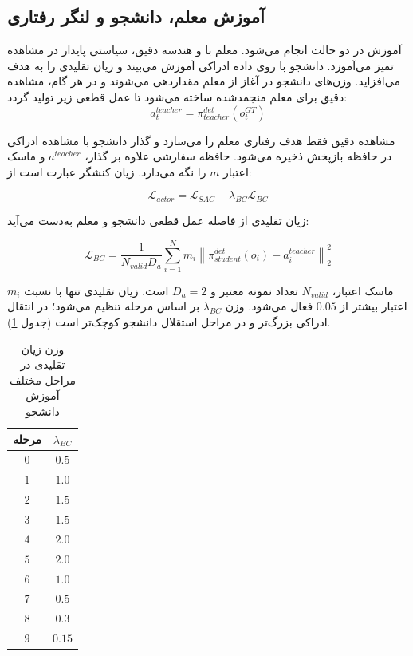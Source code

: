 \subsection{آموزش معلم، دانشجو و لنگر رفتاری}
\label{subsec:teacher_student_distillation_final}

آموزش در دو حالت انجام می‌شود. معلم با  و هندسه دقیق، سیاستی پایدار در مشاهده تمیز می‌آموزد. دانشجو با  روی داده ادراکی آموزش می‌بیند و زیان تقلیدی را به هدف  می‌افزاید. وزن‌های دانشجو در آغاز از معلم مقداردهی می‌شوند و در هر گام، مشاهده دقیق برای معلم منجمد‌شده%
ساخته می‌شود تا عمل قطعی زیر تولید گردد:
\begin{equation}
	a^{teacher}_t = \pi^{det}_{teacher}\left(o^{GT}_t\right)
	\label{eq:teacher_action_final}
\end{equation}

مشاهده دقیق فقط هدف رفتاری معلم را می‌سازد و گذار دانشجو با مشاهده ادراکی در حافظه بازپخش ذخیره می‌شود. حافظه سفارشی علاوه بر گذار، \(a^{teacher}\) و ماسک اعتبار \(m\) را نگه می‌دارد. زیان کنشگر عبارت است از:

\begin{equation}
	\mathcal{L}_{actor}=
	\mathcal{L}_{SAC}+\lambda_{BC}\mathcal{L}_{BC}
	\label{eq:distilled_actor_loss_final}
\end{equation}

زیان تقلیدی از فاصله عمل قطعی دانشجو و معلم به‌دست می‌آید:

\begin{equation}
	\mathcal{L}_{BC}=
	\frac{1}{N_{valid}D_a}
	\sum_{i=1}^{N}
	m_i
	\left\|
	\pi^{det}_{student}(o_i)-a^{teacher}_i
	\right\|_2^2
	\label{eq:bc_loss_final}
\end{equation}

\(m_i\) ماسک اعتبار، \(N_{valid}\) تعداد نمونه معتبر و \(D_a=2\) است. زیان تقلیدی تنها با نسبت اعتبار بیشتر از \(0.05\) فعال می‌شود. وزن \(\lambda_{BC}\) بر اساس مرحله تنظیم می‌شود؛ در انتقال ادراکی بزرگ‌تر و در مراحل استقلال دانشجو کوچک‌تر است (جدول \ref{tab:bc_weight_by_stage_final}).

\begin{table}[htbp]
	\centering
	\caption{وزن زیان تقلیدی در مراحل مختلف آموزش دانشجو}
	\label{tab:bc_weight_by_stage_final}
	\begin{tabular}{|c|c|}
		\hline
		\textbf{مرحله} & \(\lambda_{BC}\) \\
		\hline
		$0$ & $0.5$ \\
		\hline
		$1$ & $1.0$ \\
		\hline
		$2$ & $1.5$ \\
		\hline
		$3$ & $1.5$ \\
		\hline
		$4$ & $2.0$ \\
		\hline
		$5$ & $2.0$ \\
		\hline
		$6$ & $1.0$ \\
		\hline
		$7$ & $0.5$ \\
		\hline
		$8$ & $0.3$ \\
		\hline
		$9$ & $0.15$ \\
		\hline
	\end{tabular}
\end{table}

